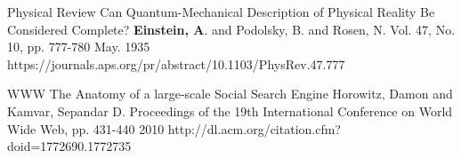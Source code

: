 


\begin{cventries}

  \cvpublicationentry
    {Physical Review} %
    {Can Quantum-Mechanical Description of Physical Reality Be Considered Complete?} %
    {\textbf{Einstein, A}. and Podolsky, B. and Rosen, N.} %
    {Vol. 47, No. 10, pp. 777-780}
    {May. 1935} %
    {https://journals.aps.org/pr/abstract/10.1103/PhysRev.47.777}
\end{cventries}

\begin{cventries}

  \cvpublicationentry
    {WWW} %
    {The Anatomy of a large-scale Social Search Engine} %
    {Horowitz, Damon and Kamvar, Sepandar D.} %
    {Proceedings of the 19th International Conference on World Wide Web, pp. 431-440}
    {2010} %
    {http://dl.acm.org/citation.cfm?doid=1772690.1772735}
\end{cventries}